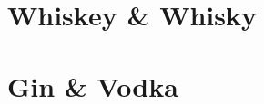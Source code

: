 \documentclass[../../cookbook.tex]{subfiles}
\begin{document}
\section{Whiskey \& Whisky}
{%
    \let\section\subsection%
    \let\subsection\subsubsection%
    
    
    
    
    
    
    
}

\section{Gin \& Vodka}
{%
    \let\section\subsection%
    \let\subsection\subsubsection%
    
    
    
    
    
}
\end{document}
